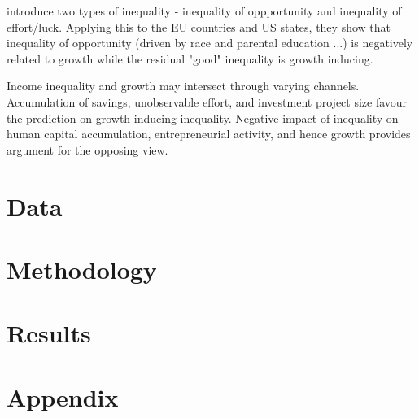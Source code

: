 \documentclass[a4paper,11pt]{article}
\begin{document}
\citet{marrero2013inequality} introduce two types of inequality - inequality of oppportunity and inequality of effort/luck. Applying this to the EU countries and US states, they show that inequality of opportunity (driven by race and parental education ...) is negatively related to growth while the residual "good" inequality is growth inducing.

Income inequality and growth may intersect through varying channels. Accumulation of savings, unobservable effort, and investment project size favour the prediction on growth inducing inequality. Negative impact of inequality on human capital accumulation, entrepreneurial activity, and hence growth provides argument for the opposing view.
\section{Data}

\section{Methodology}

\section{Results}


\clearpage
%


%
\clearpage
%
\appendix
\section{Appendix}

\renewcommand{\thesection}{A\arabic{section}}%
\renewcommand{\thetable}{A\arabic{table}}%
\renewcommand{\thefigure}{A\arabic{figure}}%
\renewcommand{\theequation}{A\arabic{eq}} 
\end{document}
